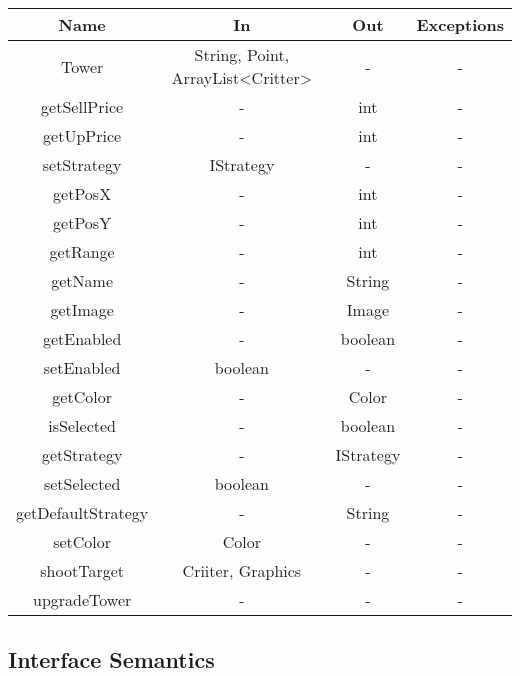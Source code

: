 \documentclass[12,english]{article}
\begin{document}
	\begin{tabular}[pos]{|c|c|c|c|}
	\hline
	\textbf{Name}& \textbf{In} & \textbf{Out} & \textbf{Exceptions} \\ 
	\hline
	Tower & String, Point, ArrayList<Critter> & - & - \\ \hline
	getSellPrice & - & int & - \\ \hline
	getUpPrice & - & int & - \\ \hline
	setStrategy & IStrategy & - & - \\ \hline
	getPosX & - & int & - \\ \hline
	getPosY & - & int & - \\ \hline
	getRange & - & int & - \\ \hline
	getName & - & String & - \\ \hline
	getImage & - & Image & - \\ \hline
	getEnabled & - & boolean & - \\ \hline
	setEnabled & boolean & - & - \\ \hline
	getColor & - & Color & - \\ \hline
	isSelected & - & boolean & - \\ \hline
	getStrategy & - & IStrategy & - \\ \hline
	setSelected & boolean & - & - \\ \hline
	getDefaultStrategy & - & String & - \\ \hline
	setColor & Color & - & - \\ \hline
	shootTarget & Criiter, Graphics & - & - \\ \hline
	upgradeTower & - & - & - \\ \hline
	
	\end{tabular}		
		
	\subsection{Interface Semantics}
\end{document}
